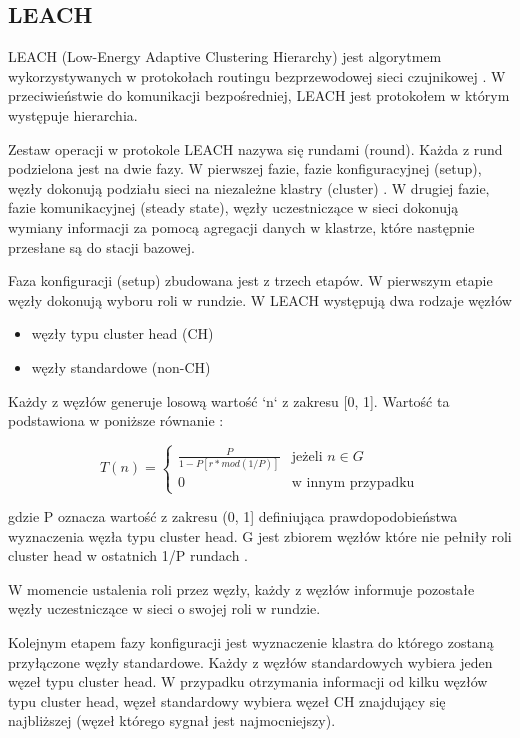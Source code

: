 \documentclass[a4paper,12pt,twoside,openany]{report}
\begin{document}
\subsection{LEACH}

LEACH (Low-Energy Adaptive Clustering Hierarchy) jest algorytmem wykorzystywanych w protokołach routingu bezprzewodowej sieci czujnikowej \cite{Akyildiz}.
W przeciwieństwie do komunikacji bezpośredniej, LEACH jest protokołem w którym występuje hierarchia. 

Zestaw operacji w protokole LEACH nazywa się rundami (round). Każda z rund podzielona jest na dwie fazy.
W pierwszej fazie, fazie konfiguracyjnej (setup), węzły dokonują podziału sieci na niezależne klastry (cluster) \cite{DynamicCH-Jia}.
W drugiej fazie, fazie komunikacyjnej (steady state), węzły uczestniczące w sieci dokonują wymiany informacji za pomocą agregacji danych w klastrze, które następnie
przesłane są do stacji bazowej.

Faza konfiguracji (setup) zbudowana jest z trzech etapów.
W pierwszym etapie węzły dokonują wyboru roli w rundzie. W LEACH występują dwa rodzaje węzłów 

\begin{itemize}
 \item węzły typu cluster head (CH)
 \item węzły standardowe (non-CH)
\end{itemize}

Każdy z węzłów generuje losową wartość `n` z zakresu [0, 1]. Wartość ta podstawiona w poniższe równanie :

\[
T(n) = \begin{cases}
\frac{P}{1 - P[r * mod(1/P)]} & \text{jeżeli } n \in G\\
0 & \text{w innym przypadku}
\end{cases}
\]

gdzie P oznacza wartość z zakresu (0, 1] definiująca prawdopodobieństwa wyznaczenia węzła typu cluster head.
G jest zbiorem węzłów które nie pełniły roli cluster head w ostatnich 1/P rundach \cite{Bajelan}.

W momencie ustalenia roli przez węzły, każdy z węzłów informuje pozostałe węzły uczestniczące w sieci o swojej roli w rundzie.

Kolejnym etapem fazy konfiguracji jest wyznaczenie klastra do którego zostaną przyłączone węzły standardowe.
Każdy z węzłów standardowych wybiera jeden węzeł typu cluster head. W przypadku otrzymania informacji od kilku węzłów typu cluster head,
węzeł standardowy wybiera węzeł CH znajdujący się najbliższej (węzeł którego sygnał jest najmocniejszy).
\end{document}
